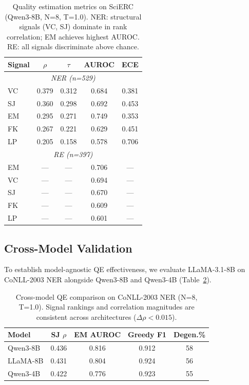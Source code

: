 \documentclass[11pt,a4paper]{article}
\begin{document}
\begin{table}[t]
\centering
\small
\begin{tabular}{lcccc}
\toprule
Signal & $\rho$ & $\tau$ & AUROC & ECE \\
\midrule
\multicolumn{5}{c}{\textit{NER (n=529)}} \\
\midrule
VC & 0.379 & 0.312 & 0.684 & 0.381 \\
SJ & 0.360 & 0.298 & 0.692 & 0.453 \\
EM & 0.295 & 0.271 & 0.749 & 0.353 \\
FK & 0.267 & 0.221 & 0.629 & 0.451 \\
LP & 0.205 & 0.158 & 0.578 & 0.706 \\
\midrule
\multicolumn{5}{c}{\textit{RE (n=397)}} \\
\midrule
EM & --- & --- & 0.706 & --- \\
VC & --- & --- & 0.694 & --- \\
SJ & --- & --- & 0.670 & --- \\
FK & --- & --- & 0.609 & --- \\
LP & --- & --- & 0.601 & --- \\
\bottomrule
\end{tabular}
\caption{Quality estimation metrics on SciERC (Qwen3-8B, N=8, T=1.0). NER: structural signals (VC, SJ) dominate in rank correlation; EM achieves highest AUROC. RE: all signals discriminate above chance.}
\label{tab:qe_main}
\end{table}

\subsection{Cross-Model Validation}
\label{sec:cross_model}

To establish model-agnostic QE effectiveness, we evaluate LLaMA-3.1-8B on CoNLL-2003 NER alongside Qwen3-8B and Qwen3-4B (Table~\ref{tab:cross_model}).

\begin{table}[t]
\centering
\small
\begin{tabular}{lcccc}
\toprule
Model & SJ $\rho$ & EM AUROC & Greedy F1 & Degen.\% \\
\midrule
Qwen3-8B & 0.436 & 0.816 & 0.912 & 58 \\
LLaMA-8B & 0.431 & 0.804 & 0.924 & 56 \\
Qwen3-4B & 0.422 & 0.776 & 0.923 & 55 \\
\bottomrule
\end{tabular}
\caption{Cross-model QE comparison on CoNLL-2003 NER (N=8, T=1.0). Signal rankings and correlation magnitudes are consistent across architectures ($\Delta\rho < 0.015$).}
\label{tab:cross_model}
\end{table}
\end{document}
